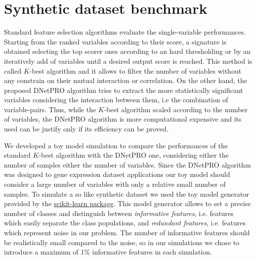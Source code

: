 \documentclass{standalone}
\begin{document}
\section[Toy Model]{Synthetic dataset benchmark}\label{dnetpro:toy}

Standard feature selection algorithms evaluate the single-variable performances.
Starting from the ranked variables according to their score, a signature is obtained selecting the top scorer ones according to an hard thresholding or by an iteratively add of variables until a desired output score is reached.
This method is called $K$-best algorithm and it allows to filter the number of variables without any constrain on their mutual interaction or correlation.
On the other hand, the proposed DNetPRO algorithm tries to extract the more statistically significant variables considering the interaction between them, i.e the combination of variable-pairs.
Thus, while the $K$-best algorithm scaled according to the number of variables, the DNetPRO algorithm is more computational expensive and its used can be justify only if its efficiency can be proved.

We developed a toy model simulation to compare the performances of the standard $K$-best algorithm with the DNetPRO one, considering either the number of samples either the number of variables.
Since the DNetPRO algorithm was designed to gene expression dataset applications our toy model should consider a large number of variables with only a relative small number of samples.
To simulate a so like synthetic dataset we used the toy model generator provided by the \href{https://scikit-learn.org/stable/modules/generated/sklearn.datasets.make_classification.html}{scikit-learn package}.
This model generator allows to set a precise number of classes and distinguish between \emph{informative features}, i.e. features which easily separate the class populations, and \emph{redundant features}, i.e. features which represent noise in our problem.
The number of informative features should be realistically small compared to the noise, so in our simulations we chose to introduce a maximum of 1\% informative features in each simulation.
\end{document}
